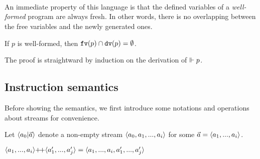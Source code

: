 	\PT{\Axiom{\wf{\epsilon}}}
    \\[3ex]
   	
   	\\[3ex]
   
   \\[3ex]
   

An immediate property of this language is that the defined variables of a \emph{well-formed} \fmsvcode program are always fresh. In other words, there is no overlapping between the free variables and the newly generated ones.


\begin{lem}
	If $p$ is well-formed, then  $\mathtt{fv}(p) \cap \mathtt{dv}(p) = \emptyset $. 
\end{lem}

The proof is straightward by induction on the derivation of $\Vdash p$.


\subsection{Instruction semantics}

Before showing the semantics, we first introduce some notations and operations about streams for convenience.
\begin{nota}
	Let $\< a_0 | \a \'>$ denote a non-empty stream $\< a_0,a_1,...,a_i \'>$ for some $\a = \< a_1,...,a_i \'>$. 
\end{nota}


\begin{nota}
	$\vapp{\vrange{a_1}{a_i}} {\vrange{a_1'}{a_j'}} = \langle a_1,...,a_i,a_1',...,a_j' \rangle $ \\
	
\end{nota}

